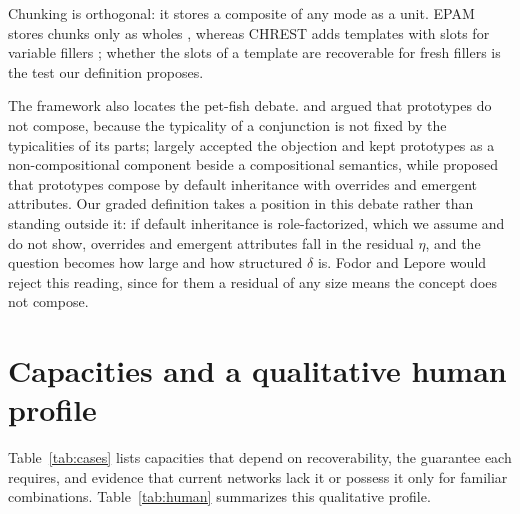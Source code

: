 \documentclass[10pt]{article}
\theoremstyle{plain}
\theoremstyle{remark}
\begin{document}
\noindent
Chunking is orthogonal: it stores a composite of any mode as a unit. EPAM stores chunks only as wholes \citep{feigenbaum1984}, whereas CHREST adds templates with slots for variable fillers \citep{gobet1996templates,gobet2000}; whether the slots of a template are recoverable for fresh fillers is the test our definition proposes.

The framework also locates the pet-fish debate. \citet{osherson1981} and \citet{fodor1996} argued that prototypes do not compose, because the typicality of a conjunction is not fixed by the typicalities of its parts; \citet{kamp1995} largely accepted the objection and kept prototypes as a non-compositional component beside a compositional semantics, while \citet{hampton1987,hampton2012} proposed that prototypes compose by default inheritance with overrides and emergent attributes. Our graded definition takes a position in this debate rather than standing outside it: if default inheritance is role-factorized, which we assume and do not show, overrides and emergent attributes fall in the residual $\eta$, and the question becomes how large and how structured $\delta$ is. Fodor and Lepore would reject this reading, since for them a residual of any size means the concept does not compose.

\section{Capacities and a qualitative human profile}
\label{app:cases}

Table~\ref{tab:cases} lists capacities that depend on recoverability, the guarantee each requires, and evidence that current networks lack it or possess it only for familiar combinations. Table~\ref{tab:human} summarizes this qualitative profile.
\end{document}
